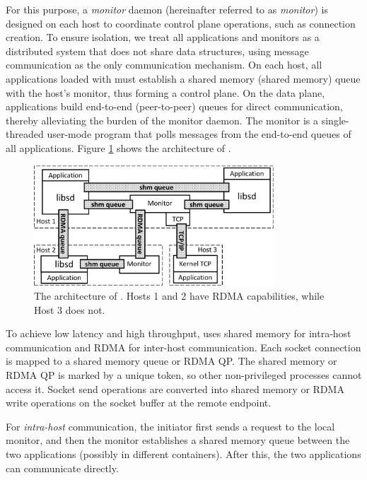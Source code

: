 For this purpose, a \emph{monitor} daemon (hereinafter referred to as \textit{monitor}) is designed on each host to coordinate control plane operations, such as connection creation. To ensure isolation, we treat all applications and monitors as a distributed system that does not share data structures, using message communication as the only communication mechanism. On each host, all applications loaded with \libipc{} must establish a shared memory (shared memory) queue with the host's monitor, thus forming a control plane. On the data plane, applications build end-to-end (peer-to-peer) queues for direct communication, thereby alleviating the burden of the monitor daemon. The monitor is a single-threaded user-mode program that polls messages from the end-to-end queues of all applications. Figure \ref{socksdirect:fig:architecture} shows the architecture of \sys{}.

\begin{figure}[htbp]
	\centering
	\includegraphics[width=0.8\textwidth]{images/architecture_new}
	\caption{The architecture of \sys{}. Hosts 1 and 2 have RDMA capabilities, while Host 3 does not.}
	\label{socksdirect:fig:architecture}
\end{figure}

To achieve low latency and high throughput, \sys{} uses shared memory for intra-host communication and RDMA for inter-host communication. Each socket connection is mapped to a shared memory queue or RDMA QP. The shared memory or RDMA QP is marked by a unique token, so other non-privileged processes cannot access it. Socket send operations are converted into shared memory or RDMA write operations on the socket buffer at the remote endpoint.

For \emph{intra-host} communication, the initiator first sends a request to the local monitor, and then the monitor establishes a shared memory queue between the two applications (possibly in different containers). After this, the two applications can communicate directly.

